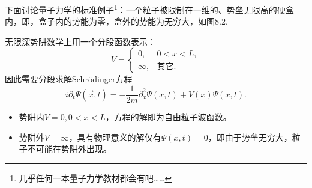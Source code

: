 下面讨论量子力学的标准例子\footnote{几乎任何一本量子力学教材都会有吧……}：一个粒子被限制在一维的、势垒无限高的硬盒内，即，盒子内的势能为零，盒外的势能为无穷大，如图8.2.

无限深势阱数学上用一个分段函数表示：
\begin{equation}
\label{equ8.27}
	V =
		\begin{cases}
			0, & 0 < x < L, \\
			\infty, & \text{其它}.
		\end{cases}
\end{equation}
因此需要分段求解Schrödinger方程
\[
	i \partial_t \Psi(\vec{x}, t) = -\frac{1}{2m} \partial_x^2 \Psi(x, t) + V(x) \Psi(x, t).
\]
\begin{itemize}
	\item 势阱内$V = 0, 0 < x < L$，方程的解即为自由粒子波函数。
	\item 势阱外$V = \infty$，具有物理意义的解仅有$\Psi(x, t) = 0$，即由于势垒无穷大，粒子不可能在势阱外出现。
\end{itemize}

